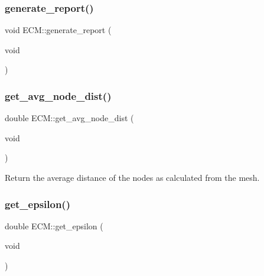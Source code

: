 \mbox{\label{classECM_ab6d157d62196d68af2437ffb3edc19fe}} 
\subsubsection{\texorpdfstring{generate\_report()}{generate\_report()}}
{\footnotesize\ttfamily void E\+C\+M\+::generate\+\_\+report (\begin{DoxyParamCaption}\item[{void}]{ }\end{DoxyParamCaption})}

\mbox{\label{classECM_ab8d8c6f37cbbf963cad176bfd5c45658}} 
\subsubsection{\texorpdfstring{get\_avg\_node\_dist()}{get\_avg\_node\_dist()}}
{\footnotesize\ttfamily double E\+C\+M\+::get\+\_\+avg\+\_\+node\+\_\+dist (\begin{DoxyParamCaption}\item[{void}]{ }\end{DoxyParamCaption})\hspace{0.3cm}{\ttfamily [inline]}}

Return the average distance of the nodes as calculated from the mesh. \mbox{\label{classECM_a0ce08b5de6aebfe790a0a6a9967d832c}} 
\subsubsection{\texorpdfstring{get\_epsilon()}{get\_epsilon()}}
{\footnotesize\ttfamily double E\+C\+M\+::get\+\_\+epsilon (\begin{DoxyParamCaption}\item[{void}]{ }\end{DoxyParamCaption})\hspace{0.3cm}{\ttfamily [inline]}}

\mbox{\label{classECM_a740df2034bc69bb26c6ba1780f644329}} 
